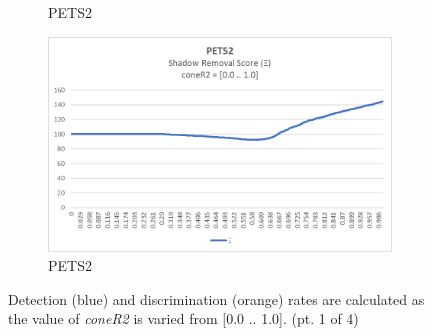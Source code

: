 \begin{appendices}
\begin{figure}
\begin{subfigure}{.45\linewidth}
  \caption{PETS2}
\end{subfigure}
\hfill
\begin{subfigure}{.45\linewidth}
  \includegraphics[width=1\linewidth]{figures/appendix/pets2_coneR2_score.jpg}
  \caption{PETS2}
\end{subfigure}
\caption{Detection (blue) and discrimination (orange) rates are calculated as the value of \textit{coneR2} is varied from [0.0 .. 1.0]. (pt. 1 of 4)}

\end{figure}

\begin{figure}


\end{figure}
\end{appendices}
